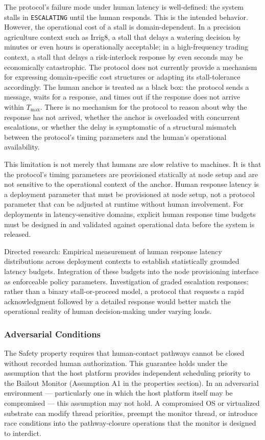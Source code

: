 The protocol's failure mode under human latency is well-defined: the system stalls in \texttt{ESCALATING} until the human responds. This is the intended behavior. However, the operational cost of a stall is domain-dependent. In a precision agriculture context such as Irrig8, a stall that delays a watering decision by minutes or even hours is operationally acceptable; in a high-frequency trading context, a stall that delays a risk-interlock response by even seconds may be economically catastrophic. The protocol does not currently provide a mechanism for expressing domain-specific cost structures or adapting its stall-tolerance accordingly. The human anchor is treated as a black box: the protocol sends a message, waits for a response, and times out if the response does not arrive within $T_{\text{max}}$. There is no mechanism for the protocol to reason about why the response has not arrived, whether the anchor is overloaded with concurrent escalations, or whether the delay is symptomatic of a structural mismatch between the protocol's timing parameters and the human's operational availability.

This limitation is not merely that humans are slow relative to machines. It is that the protocol's timing parameters are provisioned statically at node setup and are not sensitive to the operational context of the anchor. Human response latency is a deployment parameter that must be provisioned at node setup, not a protocol parameter that can be adjusted at runtime without human involvement. For deployments in latency-sensitive domains, explicit human response time budgets must be designed in and validated against operational data before the system is released.

Directed research: Empirical measurement of human response latency distributions across deployment contexts to establish statistically grounded latency budgets. Integration of these budgets into the node provisioning interface as enforceable policy parameters. Investigation of graded escalation responses: rather than a binary stall-or-proceed model, a protocol that requests a rapid acknowledgment followed by a detailed response would better match the operational reality of human decision-making under varying loads.

\subsubsection{Adversarial Conditions}

The Safety property requires that human-contact pathways cannot be closed without recorded human authorization. This guarantee holds under the assumption that the host platform provides independent scheduling priority to the Bailout Monitor (Assumption A1 in the properties section). In an adversarial environment --- particularly one in which the host platform itself may be compromised --- this assumption may not hold. A compromised OS or virtualized substrate can modify thread priorities, preempt the monitor thread, or introduce race conditions into the pathway-closure operations that the monitor is designed to interdict.

